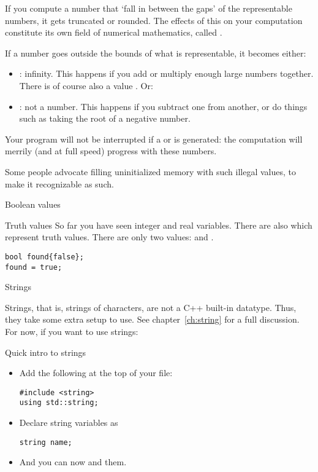 If you compute a number that `fall in between the gaps' of the
representable numbers, it gets truncated or rounded. The effects of
this on your computation constitute its own field of numerical
mathematics, called .

If a number goes outside the bounds of what is representable, it
becomes either:
\begin{itemize}
\item {}: infinity. This happens if you add or multiply
  enough large numbers together. There is of course also a value
  . Or:
\item {}: not a number. This happens if you subtract
  one  from another, or do things such as taking the
  root of a negative number.
\end{itemize}
Your program will not be interrupted if a  or  is
generated: the computation will merrily (and at full speed) progress with these numbers.

Some people advocate filling uninitialized memory with such illegal
values, to make it recognizable as such.

 {Boolean values}

\begin{block}{Truth values}
  \label{sl:bool-var}
  So far you have seen integer and real variables. There are also
   which represent truth values. There are
  only two values:  and .
\begin{verbatim}
bool found{false};
found = true;
\end{verbatim}
\end{block}

 {Strings}

Strings, that is, strings of characters, are not a C++ built-in
datatype. Thus, they take some extra setup to use.
See chapter~\ref{ch:string} for a full discussion.
For now, if you
want to use strings:

\begin{block}{Quick intro to strings}
  \label{sl:quick-string}
  \begin{itemize}
  \item Add the following at the top of your file:
\begin{verbatim}
#include <string>
using std::string;
\end{verbatim}
\item Declare string variables as
\begin{verbatim}
string name;
\end{verbatim}
\item And you can now  and  them.
  \end{itemize}
\end{block}

